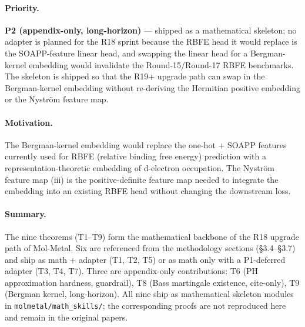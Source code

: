 \paragraph{Priority.}
\textbf{P2 (appendix-only, long-horizon)} --- shipped as a
mathematical skeleton; no adapter is planned for the R18 sprint
because the RBFE head it would replace is the SOAPP-feature
linear head, and swapping the linear head for a Bergman-kernel
embedding would invalidate the Round-15/Round-17 RBFE
benchmarks.  The skeleton is shipped so that the R19+ upgrade
path can swap in the Bergman-kernel embedding without
re-deriving the Hermitian positive embedding or the Nystr\"om
feature map.

\paragraph{Motivation.}
The Bergman-kernel embedding would replace the one-hot +
SOAPP features currently used for RBFE (relative binding free
energy) prediction with a representation-theoretic embedding of
d-electron occupation.  The Nystr\"om feature map (iii) is the
positive-definite feature map needed to integrate the embedding
into an existing RBFE head without changing the downstream loss.

\paragraph{Summary.}
The nine theorems (T1--T9) form the mathematical backbone of the
R18 upgrade path of Mol-Metal.  Six are referenced from the
methodology sections (§3.4--§3.7) and ship as math + adapter (T1,
T2, T5) or as math only with a P1-deferred adapter (T3, T4, T7).
Three are appendix-only contributions: T6 (PH approximation
hardness, guardrail), T8 (Bass martingale existence, cite-only),
T9 (Bergman kernel, long-horizon).  All nine ship as mathematical
skeleton modules in \texttt{molmetal/math\_skills/}; the
corresponding proofs are not reproduced here and remain in the
original papers.

\endinput
